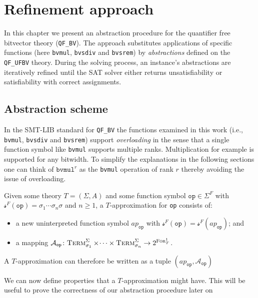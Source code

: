 \chapter{Refinement approach}
\label{ch:refinement}
In this chapter we present an abstraction procedure for the quantifier free bitvector theory (\texttt{QF\_BV}).
The approach substitutes applications of specific functions (here \texttt{bvmul}, \texttt{bvsdiv} and \texttt{bvsrem}) by \textit{abstractions} defined on the \texttt{QF\_UFBV} theory.
During the solving process, an instance's abstractions are iteratively refined until the SAT solver either returns unsatisfiability or satisfiability with correct assignments.

\section{Abstraction scheme}
In the SMT-LIB standard \cite{BarFT-SMTLIB} for \texttt{QF\_BV} the functions examined in this work (i.e., \texttt{bvmul}, \texttt{bvsdiv} and \texttt{bvsrem}) support \textit{overloading} in the sense that a single function symbol like \texttt{bvmul} supports multiple ranks. Multiplication for example is supported for any bitwidth.
To simplify the explanations in the following sections one can think of $\texttt{bvmul}^r$ as the \texttt{bvmul} operation of rank $r$ thereby avoiding the issue of overloading.

\begin{definition}[Approximation]
Given some theory $T=\left(\Sigma,A\right)$ and some function symbol $\texttt{op}\in\Sigma^F$ with $\mathcal{s}^F\left(\texttt{op}\right)=\sigma_1\dotsi\sigma_n\sigma$ and $n\geq1$, a $T$-approximation for \texttt{op} consists of:
\begin{itemize}
    \item a new uninterpreted function symbol $ap_{\texttt{op}}$ with $\mathcal{s}^F\left(\texttt{op}\right) = \mathcal{s}^F\left(ap_{\texttt{op}}\right)$; and
    \item a mapping $\mathcal{A}_{\texttt{op}}\colon \textsc{Term}^\Sigma_{\sigma_1}\times\dotsi\times\textsc{Term}^\Sigma_{\sigma_n} \to 2^{\textsc{For}^1_T}$.
\end{itemize}
A $T$-approximation can therefore be written as a tuple $\left(ap_{\texttt{op}}, \mathcal{A}_{\texttt{op}}\right)$
\end{definition}
We can now define properties that a $T$-approximation might have. This will be useful to prove the correctness of our abstraction procedure later on

